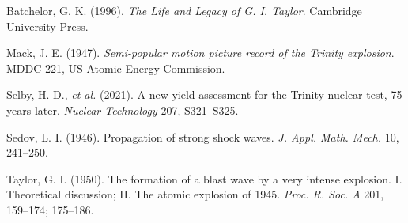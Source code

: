 \documentclass[11pt,a4paper]{article}
\begin{document}
{\footnotesize\raggedright
Batchelor, G. K. (1996). \textit{The Life and Legacy of G. I. Taylor}. Cambridge University Press.\par
Mack, J. E. (1947). \textit{Semi-popular motion picture record of the Trinity explosion}. MDDC-221, US Atomic Energy Commission.\par
Selby, H. D., \textit{et al.} (2021). A new yield assessment for the Trinity nuclear test, 75 years later. \textit{Nuclear Technology} 207, S321--S325.\par
Sedov, L. I. (1946). Propagation of strong shock waves. \textit{J. Appl. Math. Mech.} 10, 241--250.\par
Taylor, G. I. (1950). The formation of a blast wave by a very intense explosion. I. Theoretical discussion; II. The atomic explosion of 1945. \textit{Proc. R. Soc. A} 201, 159--174; 175--186.\par}

\clearpage
\normallayout

\end{document}
